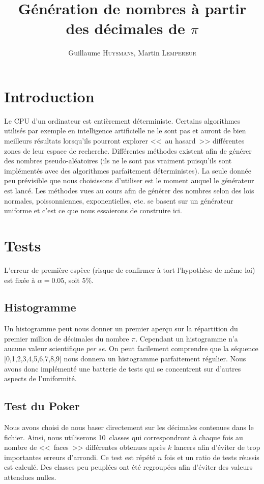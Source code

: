 \documentclass[12pt,a4paper]{article}
\author{Guillaume \textsc{Huysmans}, Martin \textsc{Lempereur}}
\title{Génération de nombres à partir des décimales de $\pi$}
\begin{document}
\maketitle

\section{Introduction}
Le CPU d'un ordinateur est entièrement déterministe. Certains algorithmes
utilisés par exemple en intelligence artificielle ne le sont pas et auront de
bien meilleurs résultats lorsqu'ils pourront explorer <<~au hasard~>> différentes
zones de leur espace de recherche. Différentes méthodes existent afin de générer
des nombres pseudo-aléatoires (ils ne le sont pas vraiment puisqu'ils sont
implémentés avec des algorithmes parfaitement déterministes). La seule donnée
peu prévisible que nous choisissons d'utiliser est le moment auquel le générateur
est lancé.
Les méthodes vues au cours afin de générer des nombres selon des lois normales,
poissonniennes, exponentielles, etc. se basent sur un générateur uniforme et
c'est ce que nous essaierons de construire ici. 

\section{Tests}
L'erreur de première espèce (risque de confirmer à tort l'hypothèse de même loi)
est fixée à $\alpha=0.05$, soit 5\%.

\subsection{Histogramme}
Un histogramme peut nous donner un premier aperçu sur la répartition
du premier million de décimales du nombre $\pi$.
Cependant un histogramme n'a aucune valeur scientifique \textit{per se}. 
On peut facilement comprendre que la séquence [0,1,2,3,4,5,6,7,8,9]
nous donnera un histogramme parfaitement régulier.
Nous avons donc implémenté une batterie de tests qui se concentrent sur d'autres aspects de l'uniformité.

\subsection{Test du Poker}
Nous avons choisi de nous baser directement sur les décimales contenues
dans le fichier. Ainsi, nous utiliserons 10~classes qui correspondront
à chaque fois au nombre de <<~faces~>> différentes obtenues
après $k$ lancers afin d'éviter de trop importantes erreurs d'arrondi.
Ce test est répété $n$ fois et un ratio de tests réussis est calculé.
Des classes peu peuplées ont été regroupées afin d'éviter
des valeurs attendues nulles.
\end{document}
